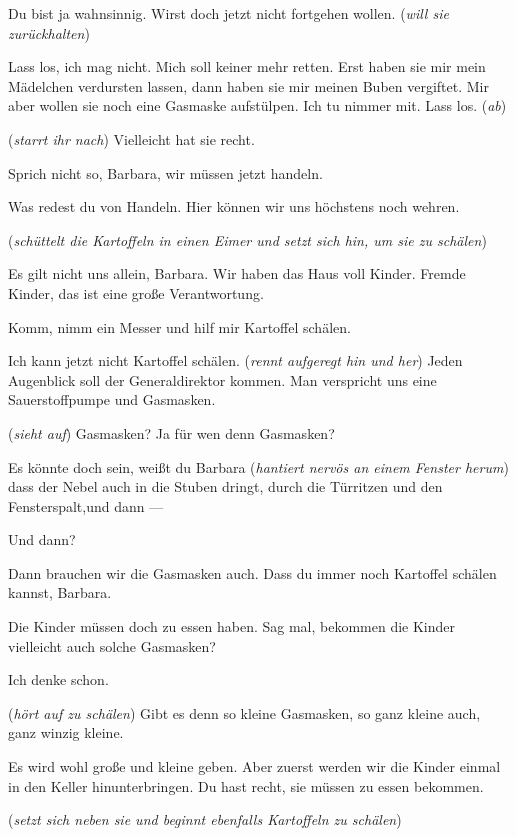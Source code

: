 \documentclass[
	final,
	a4paper,
	ngerman,
	mpinclude = true, %
	twoside = true,
	open = right,
	cleardoublepage = plain,
	DIV = 13,
	BCOR = 1cm,
	titlepage = firstiscover,
	]{scrbook}
\newcommand{\direction}[1]{(\textit{#1})}
\newcommand{\thecharacter}[1]{\textup{\textsc{#1}}\xspace}
\newcommand{\theBarbara}{\thecharacter{Barbara}}
\newcommand{\theJosef}{\thecharacter{Josef}}
\newcommand{\theKathrine}{\thecharacter{Kathrine}}
\newcommand{\character}[1]{\item[#1]}
\newcommand{\Barbara}{\character{\theBarbara}}
\newcommand{\Josef}{\character{\theJosef}}
\newcommand{\Kathrine}{\character{\theKathrine}}
\begin{document}
\begin{play}
\Barbara
Du bist ja wahnsinnig. Wirst doch jetzt nicht fortgehen wollen. \direction{will sie zurückhalten}

\Kathrine
Lass los, ich mag nicht. Mich soll keiner mehr retten. Erst haben sie mir mein Mädelchen verdursten lassen, dann haben sie mir meinen Buben vergiftet. Mir aber wollen sie noch eine Gasmaske aufstülpen. Ich tu nimmer mit. Lass los. \direction{ab}

\Barbara
\direction{starrt ihr nach} Vielleicht hat sie recht.

\Josef
Sprich nicht so, Barbara, wir müssen jetzt handeln.

\Barbara
Was redest du von Handeln. Hier können wir uns höchstens noch wehren.

\direction{schüttelt die Kartoffeln in einen Eimer und setzt sich hin, um sie zu schälen}

\Josef
Es gilt nicht uns allein, Barbara. Wir haben das Haus voll Kinder. Fremde Kinder, das ist eine große Verantwortung.

\Barbara
Komm, nimm ein Messer und hilf mir Kartoffel schälen.

\Josef
Ich kann jetzt nicht Kartoffel schälen. \direction{rennt aufgeregt hin und her} Jeden Augenblick soll der Generaldirektor kommen. Man verspricht uns eine Sauerstoffpumpe und Gasmasken.

\Barbara
\direction{sieht auf} Gasmasken? Ja für wen denn Gasmasken?

\Josef
Es könnte doch sein, weißt du Barbara \direction{hantiert nervös an einem Fenster herum} dass der Nebel auch in die Stuben dringt, durch die Türritzen und den Fensterspalt,und dann ---

\Barbara
Und dann?

\Josef
Dann brauchen wir die Gasmasken auch. Dass du immer noch Kartoffel schälen kannst, Barbara.

\Barbara
Die Kinder müssen doch zu essen haben. Sag mal, bekommen die Kinder vielleicht auch solche Gasmasken?

\Josef
Ich denke schon.

\Barbara
\direction{hört auf zu schälen} Gibt es denn so kleine Gasmasken, so ganz kleine auch, ganz winzig kleine.

\Josef
Es wird wohl große und kleine geben. Aber zuerst werden wir die Kinder einmal in den Keller hinunterbringen. Du hast recht, sie müssen zu essen bekommen.

\direction{setzt sich neben sie und beginnt ebenfalls Kartoffeln zu schälen}


\end{play}
\end{document}
